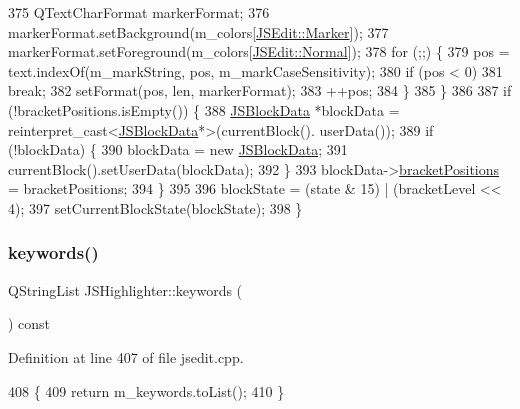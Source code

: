 \begin{DoxyCode}
375         QTextCharFormat markerFormat;
376         markerFormat.setBackground(m\_colors[\hyperlink{class_j_s_edit_a5a465193a1344e5be9b04f5ff7883213a098e62a1854a46cb2b58c49ee5d78208}{JSEdit::Marker}]);
377         markerFormat.setForeground(m\_colors[\hyperlink{class_j_s_edit_a5a465193a1344e5be9b04f5ff7883213a51b1886888e6bf8841064a795bd6ab8d}{JSEdit::Normal}]);
378         \textcolor{keywordflow}{for} (;;) \{
379             pos = text.indexOf(m\_markString, pos, m\_markCaseSensitivity);
380             \textcolor{keywordflow}{if} (pos < 0)
381                 \textcolor{keywordflow}{break};
382             setFormat(pos, len, markerFormat);
383             ++pos;
384         \}
385     \}
386 
387     \textcolor{keywordflow}{if} (!bracketPositions.isEmpty()) \{
388         \hyperlink{class_j_s_block_data}{JSBlockData} *blockData = \textcolor{keyword}{reinterpret\_cast<}\hyperlink{class_j_s_block_data}{JSBlockData}*\textcolor{keyword}{>}(currentBlock().
      userData());
389         \textcolor{keywordflow}{if} (!blockData) \{
390             blockData = \textcolor{keyword}{new} \hyperlink{class_j_s_block_data}{JSBlockData};
391             currentBlock().setUserData(blockData);
392         \}
393         blockData->\hyperlink{class_j_s_block_data_af1084b33f21551858059f78de49485a3}{bracketPositions} = bracketPositions;
394     \}
395 
396     blockState = (state & 15) | (bracketLevel << 4);
397     setCurrentBlockState(blockState);
398 \}
\end{DoxyCode}
\mbox{\label{class_j_s_highlighter_af01421450f2260f630488f63a8912445}} 
\subsubsection{\texorpdfstring{keywords()}{keywords()}}
{\footnotesize\ttfamily Q\+String\+List J\+S\+Highlighter\+::keywords (\begin{DoxyParamCaption}{ }\end{DoxyParamCaption}) const}



Definition at line 407 of file jsedit.\+cpp.


\begin{DoxyCode}
408 \{
409     \textcolor{keywordflow}{return} m\_keywords.toList();
410 \}
\end{DoxyCode}
\mbox{\label{class_j_s_highlighter_a3d552ad1d44a4192bff7ceac306b706e}} 
